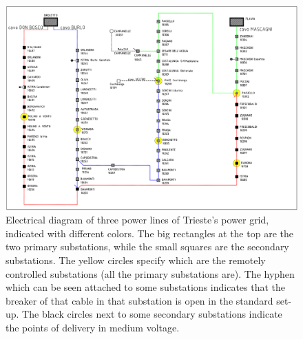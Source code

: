 \begin{figure}[ph]
    \centering
    \includegraphics[scale=0.35, center]{chapters/figures/Mastrino.png}
    \caption{Electrical diagram of three power lines of Trieste's power grid, indicated with different colors. The big rectangles at the top are the two primary substations, while the small squares are the secondary substations. The yellow circles specify which are the remotely controlled substations (all the primary substations are). The hyphen which can be seen attached to some substations indicates that the breaker of that cable in that substation is open in the standard set-up. The black circles next to some secondary substations indicate the points of delivery in medium voltage.}
    \label{fig:mastrino}
\end{figure}


